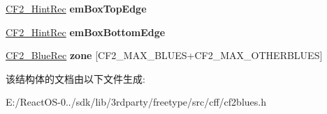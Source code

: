 \begin{DoxyCompactItemize}
\hyperlink{struct_c_f2___hint_rec__}{C\+F2\+\_\+\+Hint\+Rec} {\bfseries em\+Box\+Top\+Edge}
\item 
\mbox{\label{struct_c_f2___blues_rec___ad6497e5526fdfdc1a26dd4ebfbbe5f73}} 
\hyperlink{struct_c_f2___hint_rec__}{C\+F2\+\_\+\+Hint\+Rec} {\bfseries em\+Box\+Bottom\+Edge}
\item 
\mbox{\label{struct_c_f2___blues_rec___a979b72a40b6652540fcd3e06de97efa9}} 
\hyperlink{struct_c_f2___blue_rec__}{C\+F2\+\_\+\+Blue\+Rec} {\bfseries zone} \mbox{[}C\+F2\+\_\+\+M\+A\+X\+\_\+\+B\+L\+U\+ES+C\+F2\+\_\+\+M\+A\+X\+\_\+\+O\+T\+H\+E\+R\+B\+L\+U\+ES\mbox{]}
\end{DoxyCompactItemize}


该结构体的文档由以下文件生成\+:\begin{DoxyCompactItemize}
\item 
E\+:/\+React\+O\+S-\/0../sdk/lib/3rdparty/freetype/src/cff/cf2blues.\+h\end{DoxyCompactItemize}
